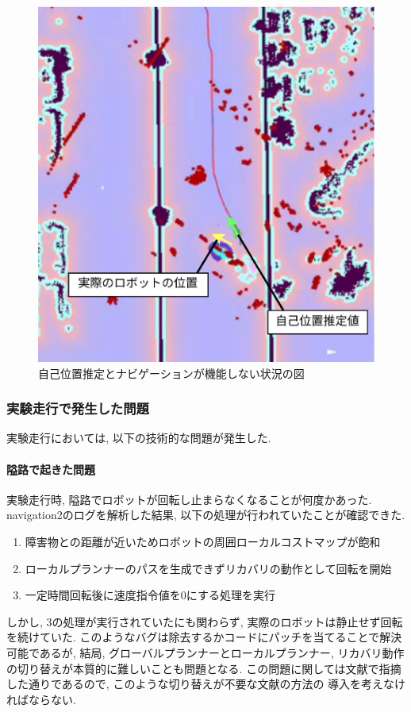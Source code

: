 \begin{figure}[h]
  \begin{center}
    \includegraphics[width=0.9\linewidth]{figs/kinako_result.eps}
    \caption{自己位置推定とナビゲーションが機能しない状況の図}
    \label{fig:kinako_result}
  \end{center}
\end{figure}



\subsubsection{実験走行で発生した問題}
実験走行においては, 以下の技術的な問題が発生した. 

\paragraph{隘路で起きた問題}
実験走行時, 隘路でロボットが回転し止まらなくなることが何度かあった. 
navigation2のログを解析した結果, 以下の処理が行われていたことが確認できた. 

\begin{enumerate}
  \item 障害物との距離が近いためロボットの周囲ローカルコストマップが飽和
  \item ローカルプランナーのパスを生成できずリカバリの動作として回転を開始
  \item  一定時間回転後に速度指令値を0にする処理を実行
\end{enumerate}
しかし, 3の処理が実行されていたにも関わらず, 
実際のロボットは静止せず回転を続けていた. 
このようなバグは除去するかコードにパッチを当てることで解決可能であるが, 
結局, グローバルプランナーとローカルプランナー, 
リカバリ動作の切り替えが本質的に難しいことも問題となる. 
この問題に関しては文献\cite{ueda2023JRM}で指摘した通りであるので, 
このような切り替えが不要な文献\cite{ueda2023JRM}の方法の
導入を考えなければならない. 

